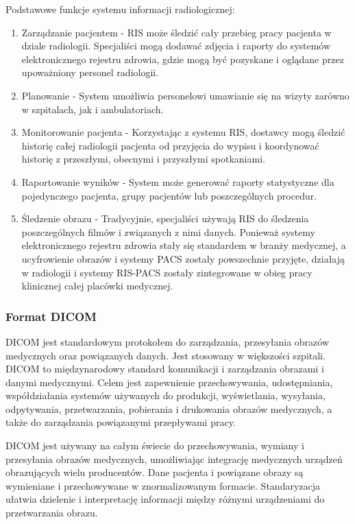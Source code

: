 \documentclass[a4paper,11pt,twoside]{report}
\theoremstyle{definition}
\begin{document}
Podstawowe funkcje systemu informacji radiologicznej:
\begin{enumerate}
\item Zarządzanie pacjentem - RIS może śledzić cały przebieg pracy pacjenta w dziale radiologii. Specjaliści mogą dodawać zdjęcia i raporty do systemów elektronicznego rejestru zdrowia, gdzie mogą być pozyskane i oglądane przez upoważniony personel radiologii.
\item Planowanie - System umożliwia personelowi umawianie się na wizyty zarówno w szpitalach, jak i ambulatoriach.
\item Monitorowanie pacjenta - Korzystając z systemu RIS, dostawcy mogą śledzić historię całej radiologii pacjenta od przyjęcia do wypisu i koordynować historię z przeszłymi, obecnymi i przyszłymi spotkaniami.
\item Raportowanie wyników - System może generować raporty statystyczne dla pojedynczego pacjenta, grupy pacjentów lub poszczególnych procedur.
\item Śledzenie obrazu - Tradycyjnie, specjaliści używają RIS do śledzenia poszczególnych filmów i związanych z nimi danych. Ponieważ systemy elektronicznego rejestru zdrowia stały się standardem w branży medycznej, a ucyfrowienie obrazów i systemy PACS zostały powszechnie przyjęte, działają w radiologii i  systemy RIS-PACS zostały zintegrowane w obieg pracy klinicznej całej placówki medycznej.
\end{enumerate}

\subsubsection{Format DICOM}

DICOM jest standardowym protokołem do zarządzania,  przesyłania obrazów medycznych oraz powiązanych danych.  Jest stosowany w większości szpitali. DICOM to międzynarodowy standard komunikacji i zarządzania obrazami i danymi medycznymi. Celem jest zapewnienie przechowywania, udostępniania, współdziałania systemów używanych do produkcji, wyświetlania, wysyłania, odpytywania, przetwarzania, pobierania i drukowania obrazów medycznych, a także do zarządzania powiązanymi przepływami pracy.
\par
DICOM jest używany na całym świecie do przechowywania, wymiany i przesyłania obrazów medycznych, umożliwiając integrację medycznych urządzeń obrazujących wielu producentów. Dane pacjenta i powiązane obrazy są wymieniane i przechowywane w znormalizowanym formacie.
Standaryzacja ułatwia dzielenie i interpretację informacji między różnymi urządzeniami do przetwarzania obrazu.
\end{document}
